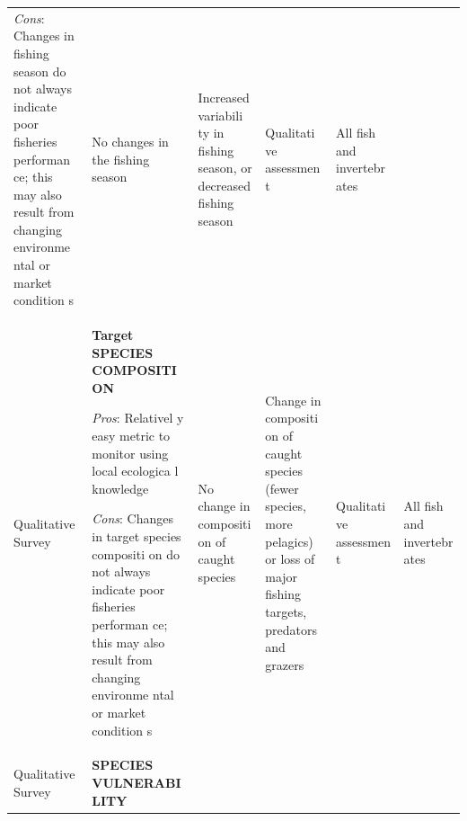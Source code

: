 \documentclass[]{book}
\begin{document}
\begin{longtable}[]{@{}llllll@{}}
\begin{minipage}[t]{0.16\columnwidth}
\emph{Cons}: Changes in fishing season do not always indicate poor
fisheries performan ce; this may also result from changing environme
ntal or market condition s\strut
\end{minipage} & \begin{minipage}[t]{0.16\columnwidth}\raggedright\strut
No changes in the fishing season\strut
\end{minipage} & \begin{minipage}[t]{0.16\columnwidth}\raggedright\strut
Increased variabili ty in fishing season, or decreased fishing
season\strut
\end{minipage} & \begin{minipage}[t]{0.16\columnwidth}\raggedright\strut
Qualitati ve assessmen t\strut
\end{minipage} & \begin{minipage}[t]{0.16\columnwidth}\raggedright\strut
All fish and invertebr ates\strut
\end{minipage}\tabularnewline
\begin{minipage}[t]{0.16\columnwidth}\raggedright\strut
Qualitative Survey\strut
\end{minipage} & \begin{minipage}[t]{0.16\columnwidth}\raggedright\strut
\textbf{Target SPECIES COMPOSITI ON}

\emph{Pros}: Relativel y easy metric to monitor using local ecologica l
knowledge

\emph{Cons}: Changes in target species compositi on do not always
indicate poor fisheries performan ce; this may also result from changing
environme ntal or market condition s\strut
\end{minipage} & \begin{minipage}[t]{0.16\columnwidth}\raggedright\strut
No change in compositi on of caught species\strut
\end{minipage} & \begin{minipage}[t]{0.16\columnwidth}\raggedright\strut
Change in compositi on of caught species (fewer species, more pelagics)
or loss of major fishing targets, predators and grazers\strut
\end{minipage} & \begin{minipage}[t]{0.16\columnwidth}\raggedright\strut
Qualitati ve assessmen t\strut
\end{minipage} & \begin{minipage}[t]{0.16\columnwidth}\raggedright\strut
All fish and invertebr ates\strut
\end{minipage}\tabularnewline
\begin{minipage}[t]{0.16\columnwidth}\raggedright\strut
Qualitative Survey\strut
\end{minipage} & \begin{minipage}[t]{0.16\columnwidth}\raggedright\strut
\textbf{SPECIES VULNERABI LITY}


\end{minipage}
\end{longtable}
\end{document}
